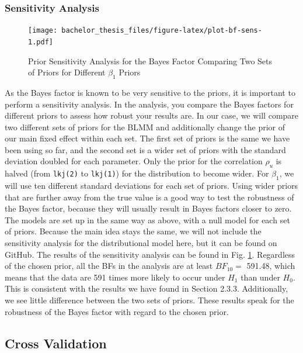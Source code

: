 \documentclass[
  doc,12pt,floatsintext]{apa7}
\begin{document}
\subsubsection{Sensitivity Analysis}\label{sensitivity-analysis}



\begin{figure}
\centering
\texttt{[image: bachelor\_thesis\_files/figure-latex/plot-bf-sens-1.pdf]}
\caption{\label{fig:plot-bf-sens}Prior Sensitivity Analysis for the Bayes Factor Comparing Two Sets of Priors for Different \(\beta_1\) Priors}
\end{figure}

As the Bayes factor is known to be very sensitive to the priors, it is important to perform a sensitivity analysis. In the analysis, you compare the Bayes factors for different priors to assess how robust your results are. In our case, we will compare two different sets of priors for the BLMM and additionally change the prior of our main fixed effect within each set. The first set of priors is the same we have been using so far, and the second set is a wider set of priors with the standard deviation doubled for each parameter. Only the prior for the correlation \(\rho_u\) is halved (from \texttt{lkj(2)} to \texttt{lkj(1)}) for the distribution to become wider. For \(\beta_1\), we will use ten different standard deviations for each set of priors. Using wider priors that are further away from the true value is a good way to test the robustness of the Bayes factor, because they will usually result in Bayes factors closer to zero. The models are set up in the same way as above, with a null model for each set of priors. Because the main idea stays the same, we will not include the sensitivity analysis for the distributional model here, but it can be found on GitHub. The results of the sensitivity analysis can be found in Fig. \ref{fig:plot-bf-sens}. Regardless of the chosen prior, all the BFs in the analysis are at least \(BF_{10} =\) 591.48, which means that the data are 591 times more likely to occur under \(H_1\) than under \(H_0\). This is consistent with the results we have found in Section 2.3.3. Additionally, we see little difference between the two sets of priors. These results speak for the robustness of the Bayes factor with regard to the chosen prior.

\subsection{Cross Validation}\label{cross-validation}
\end{document}
